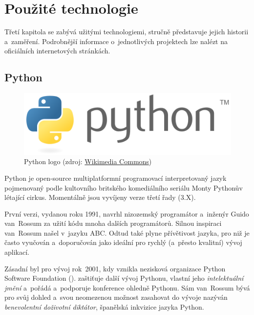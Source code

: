 \chapter{Použité technologie}
\label{3-technologie}

Třetí kapitola se zabývá užitými technologiemi, stručně představuje jejich historii a~zaměření.
Podrobnější informace o~jednotlivých projektech lze nalézt na oficiálních internetových stránkách. 


\section{Python}
\label{python}

  \begin{figure}[H]
   \centering
	\includegraphics[scale=0.5]{./pictures/python-logo-master-v3-TM.png}
	\caption[Python logo]{Python logo 
      (zdroj: \href{https://upload.wikimedia.org/wikipedia/commons/thumb/f/f8/Python\_logo\_and\_wordmark.svg/486px-Python\_logo\_and\_wordmark.svg.png}{Wikimedia Commons})}
      \label{fig:python}
  \end{figure}

Python je open-source multiplatformní programovací interpretovaný jazyk pojme\-novaný podle
kultovního britského komediálního seriálu Monty Pythonův létající cirkus. Momentálně jsou
vyvíjeny verze třetí řady (3.X). 

První verzi, vydanou roku 1991, navrhl nizozemský programátor a~inženýr Guido van~Rossum za užití kódu
mnoha dalších programátorů. Silnou inspiraci van~Rossum našel v~jazyku ABC. Odtud také plyne
přívětivost jazyka, pro niž je často vyučován a~doporučován jako ideální pro rychlý
(a~přesto kvalitní) vývoj aplikací. 

Zásadní byl pro vývoj rok~2001, kdy vznikla nezisková organizace Python Software
Foundation ().  zaštiťuje další vývoj Pythonu, vlastní jeho
\textit{intelektuální jmění} a~pořádá a~podporuje konference ohledně Pythonu. Sám van~Rossum bývá
pro svůj dohled a~svou neomezenou možnost zasahovat do vývoje nazýván \textit{benevolentní doživotní
diktátor}, španělská inkvizice jazyka Python. 

